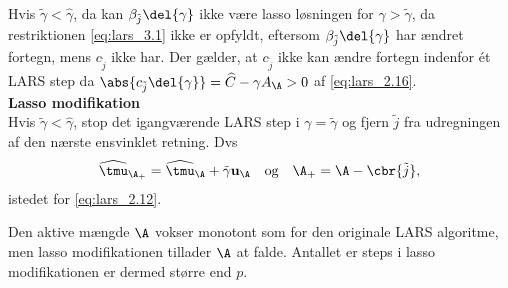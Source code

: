 Hvis \(\tilde{\gamma} < \widehat{\gamma}\), da kan \(\beta_{\tilde{j}} \del{\gamma}\) ikke være lasso løsningen for \(\gamma > \tilde{\gamma}\), da restriktionen \eqref{eq:lars_3.1} ikke er opfyldt, eftersom \(\beta_{\tilde{j}} \del{\gamma}\) har ændret fortegn, mens \(c_{\tilde{j}}\) ikke har.
Der gælder, at \(c_{\tilde{j}}\) ikke kan ændre fortegn indenfor ét LARS step da \(\abs{c_{\tilde{j}} \del{\gamma}} = \widehat{C} - \gamma A_\A> 0\) af \eqref{eq:lars_2.16}. \\[2mm]
%
\textbf{Lasso modifikation} \\
Hvis \(\tilde{\gamma} < \widehat{\gamma}\), stop det igangværende LARS step i \(\gamma = \tilde{\gamma}\) og fjern \(\tilde{j}\) fra udregningen af den nærste ensvinklet retning.
Dvs
\begin{align*}
\widehat{\tmu}_{\A_+} = \widehat{\tmu}_\A + \tilde{\gamma} \mathbf{u}_\A \quad \text{og} \quad \A_+ = \A - \cbr{\tilde{j}},
\end{align*}
istedet for \eqref{eq:lars_2.12}.

Den aktive mængde \(\A\) vokser monotont som for den originale LARS algoritme, men lasso modifikationen tillader \(\A\) at falde.
Antallet er steps i lasso modifikationen er dermed større end \(p\).

%
%
%
%
%
